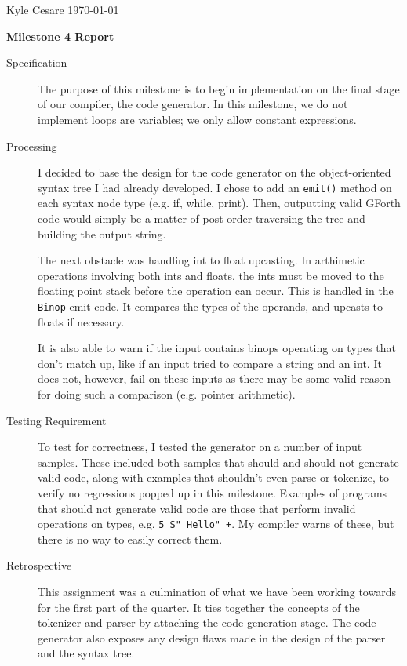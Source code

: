 \documentclass[12pt,letterpaper]{article}
\begin{document}
Kyle Cesare \hfill
\today \hfill

{\center\textbf{Milestone 4 Report} \\}

\begin{description}

\item[Specification] The purpose of this milestone is to begin implementation on
  the final stage of our compiler, the code generator. In this milestone, we do
  not implement loops are variables; we only allow constant expressions.
  
\item[Processing] I decided to base the design for the code generator on the
  object-oriented syntax tree I had already developed. I chose to add an
  \texttt{emit()} method on each syntax node type (e.g. if, while, print). Then,
  outputting valid GForth code would simply be a matter of post-order traversing
  the tree and building the output string.

  The next obstacle was handling int to float upcasting. In arthimetic
  operations involving both ints and floats, the ints must be moved to the
  floating point stack before the operation can occur. This is handled in the
  \texttt{Binop} emit code. It compares the types of the operands, and upcasts to
  floats if necessary.
  
  It is also able to warn if the input contains binops operating on types that
  don't match up, like if an input tried to compare a string and an int. It does
  not, however, fail on these inputs as there may be some valid reason for doing
  such a comparison (e.g. pointer arithmetic).
  
\item[Testing Requirement] To test for correctness, I tested the generator on a
  number of input samples. These included both samples that should and should
  not generate valid code, along with examples that shouldn't even parse or
  tokenize, to verify no regressions popped up in this milestone. Examples of
  programs that should not generate valid code are those that perform invalid
  operations on types, e.g. \texttt{5 S" Hello" +}. My compiler warns of these,
  but there is no way to easily correct them.
  
\item[Retrospective] This assignment was a culmination of what we have been
  working towards for the first part of the quarter. It ties together the
  concepts of the tokenizer and parser by attaching the code generation stage.
  The code generator also exposes any design flaws made in the design of the
  parser and the syntax tree.
  
\end{description}
\end{document}
